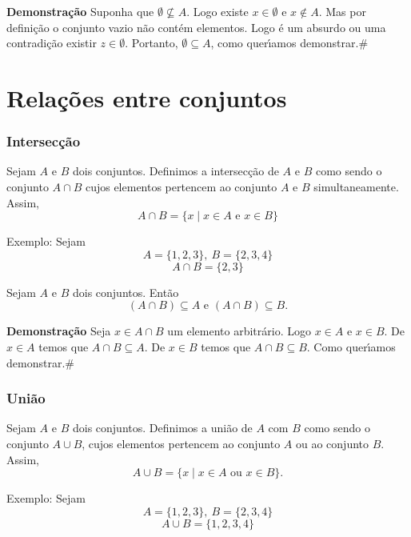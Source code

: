 \textbf{Demonstra{\c c}{\~a}o} Suponha que $ \emptyset \nsubseteq A$. Logo existe $x \in \emptyset$ e $x \notin A$. Mas por defini{\c c}{\~a}o o conjunto vazio n{\~a}o cont{\'e}m elementos. Logo {\'e} um absurdo ou uma contradi{\c c}{\~a}o existir $z \in \emptyset$. Portanto, $ \emptyset \subseteq A$, como quer{\'\i}amos demonstrar.\#

\section{Rela{\c c}{\~o}es entre conjuntos}

\subsubsection{Intersec{\c c}{\~a}o}

\begin{definicao}[Intersec{\c c}{\~a}o] Sejam $A$ e $B$ dois conjuntos. Definimos a intersec{\c c}{\~a}o de $A$ e $B$ como sendo o conjunto $A \cap B$ cujos elementos pertencem ao conjunto $A$ e $B$ simultaneamente. Assim,
\[ A \cap B = \{x \mid x \in A\mbox{ e }  x \in B\}\]
\end{definicao}

Exemplo: Sejam
\[ A = \{1,2,3\},\ B = \{2,3,4\}\]
\[A \cap B = \{2,3\}\]

\begin{proposicao} Sejam $A$ e $B$ dois conjuntos. Ent{\~a}o
\[(A \cap B) \subseteq A  \mbox{ e } (A \cap B) \subseteq B.\]
\end{proposicao}

\textbf{Demonstra{\c c}{\~a}o} Seja $x \in A \cap B$ um elemento arbitr{\'a}rio. Logo $x \in A$ e $x \in B$. De $x \in A$ temos que $A \cap B \subseteq A$. De $x \in B$ temos que $A \cap B \subseteq B$. Como quer{\'\i}amos demonstrar.\#

\subsubsection{Uni{\~a}o}

\begin{definicao}[Uni{\~a}o] Sejam $A$ e $B$ dois conjuntos. Definimos a uni{\~a}o de $A$ com $B$ como sendo o conjunto $A \cup B$, cujos elementos pertencem ao conjunto $A$ ou ao conjunto $B$. Assim,
\[A \cup B = \{x \mid x \in A \mbox{ ou } x \in B\}.\]
\end{definicao}

Exemplo: Sejam
\[A = \{1,2,3\},\ B = \{2,3,4\}\]
\[A \cup B = \{1,2,3,4\}\]

